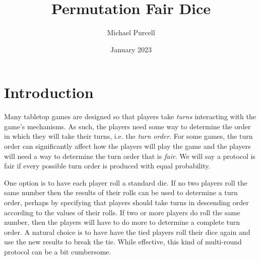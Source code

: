 \documentclass{article}
\title{Permutation Fair Dice}
\author{Michael Purcell }
\date{January 2023}
\theoremstyle{plain}
\theoremstyle{definition}
\begin{document}
\maketitle

\begin{abstract}
\lipsum[3]   
\end{abstract}

\section{Introduction}
Many tabletop games are designed so that players take \emph{turns} interacting with the game's mechanisms. As such, the players need some way to determine the order in which they will take their turns, i.e. the \emph{turn order}. For some games, the turn order can significantly affect how the players will play the game and the players will need a way to determine the turn order that is \emph{fair}. We will say a protocol is fair if every possible turn order is produced with equal probability.



One option is to have each player roll a standard die. If no two players roll the same number then the results of their rolls can be used to determine a turn order, perhaps by specifying that players should take turns in descending order according to the values of their rolls. If two or more players do roll the same number, then the players will have to do more to determine a complete turn order. A natural choice is to have have the tied players roll their dice again and use the new results to break the tie. While effective, this kind of multi-round protocol can be a bit cumbersome.
\end{document}
